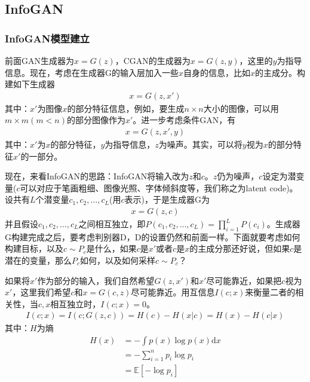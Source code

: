     \subsection{InfoGAN}
        \subsubsection{InfoGAN模型建立}
            \par
            前面GAN生成器为$x = G(z)$，CGAN的生成器为$x = G(z,y)$，这里的$y$为指导信息。现在，考虑在生成器G的输入层加入一些$x$自身的信息，比如$x$的主成分。构建如下生成器
            \begin{align*}
            x = G(z,x')
            \end{align*}
            其中：$x'$为图像$x$的部分特征信息，例如，要生成$n\times n$大小的图像，可以用$m\times m(m <n)$的部分图像作为$x'$。进一步考虑条件GAN，有
            \begin{align*}
            x = G(z,x',y)
            \end{align*}
            其中：$x'$为$x$的部分特征，$y$为指导信息，$z$为噪声。其实，可以将$y$视为$x$的部分特征$x'$的一部分。
            \par
            现在，来看InfoGAN\cite{2017.Chen}的思路：InfoGAN将输入改为$z$和$c$。$z$仍为噪声，$c$设定为潜变量($c$可以对应于笔画粗细、图像光照、字体倾斜度等，我们称之为latent code)。设共有$L$个潜变量$c_1,c_2,\dots,c_L$(用$c$表示)，于是生成器G为
            \begin{align*}
            x = G(z,c)
            \end{align*}
            并且假设$c_1,c_2,\dots,c_L$之间相互独立，即$P(c_1,c_2,\dots,c_L) = \prod_{i=1}^LP(c_i)$。生成器G构建完成之后，要考虑判别器D，D的设置仍然和前面一样。下面就要考虑如何构建目标，以及$c\sim P_c$是什么，如果$c$是$x'$或者$c$是$x$的主成分那还好说，但如果$c$是潜在的变量，那么$P_c$如何，以及如何采样$c\sim P_c$？
            \par
            如果将$x'$作为部分的输入，我们自然希望$G(z,x')$和$x'$尽可能靠近，如果把$c$视为$x'$，这里我们希望$c$和$x = G(c,z)$尽可能靠近。用互信息$I(c;x)$来衡量二者的相关性，当$c,x$相互独立时，$I(c;x) = 0$。
            \begin{align*}
            I(c;x) = I(c;G(z,c)) = H(c) - H(x|c) = H(x) -H(c|x)
            \end{align*}
            其中：$H$为熵
            \begin{align*}
            H(x) & = -\int p(x)\log p(x)\mathrm{d}x\\
            & =-\sum_{i=1}^n p_i \log p_i\\
            & =\mathbb{E}[-\log p_i]
            \end{align*}
